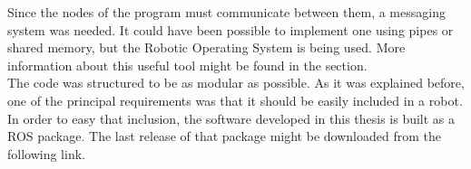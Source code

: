Since the nodes of the program must communicate between them, a messaging system was needed. It could have been possible to implement one using pipes or shared memory, but the Robotic Operating System\cite{ros} is being used. More information about this useful tool might be found in the section. 
\\

The code was structured to be as modular as possible. As it was explained before, one of the principal requirements was that it should be easily included in a robot. In order to easy that inclusion, the software developed in this thesis is built as a ROS package. 
The last release of that package might be downloaded from the following link. 


